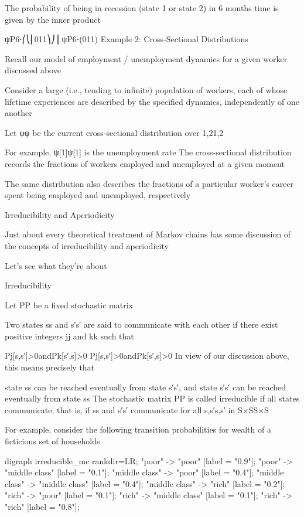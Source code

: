 The probability of being in recession (state 1 or state 2) in 6 months time is given by the inner product

ψP6⋅⎛⎝⎜011⎞⎠⎟
ψP6⋅(011)
Example 2: Cross-Sectional Distributions

Recall our model of employment / unemployment dynamics for a given worker discussed above

Consider a large (i.e., tending to infinite) population of workers, each of whose lifetime experiences are described by the specified dynamics, independently of one another

Let ψψ be the current cross-sectional distribution over {1,2}{1,2}

For example, ψ[1]ψ[1] is the unemployment rate
The cross-sectional distribution records the fractions of workers employed and unemployed at a given moment

The same distribution also describes the fractions of a particular worker’s career spent being employed and unemployed, respectively

Irreducibility and Aperiodicity

Just about every theoretical treatment of Markov chains has some discussion of the concepts of irreducibility and aperiodicity

Let’s see what they’re about

Irreducibility

Let PP be a fixed stochastic matrix

Two states ss and s′s′ are said to communicate with each other if there exist positive integers jj and kk such that

Pj[s,s′]>0andPk[s′,s]>0
Pj[s,s′]>0andPk[s′,s]>0
In view of our discussion above, this means precisely that

state ss can be reached eventually from state s′s′, and
state s′s′ can be reached eventually from state ss
The stochastic matrix PP is called irreducible if all states communicate; that is, if ss and s′s′ communicate for all s,s′s,s′ in S×SS×S

For example, consider the following transition probabilities for wealth of a ficticious set of households

digraph irreducible_mc { rankdir=LR; "poor" -> "poor" [label = "0.9"]; "poor" -> "middle class" [label = "0.1"]; "middle class" -> "poor" [label = "0.4"]; "middle class" -> "middle class" [label = "0.4"]; "middle class" -> "rich" [label = "0.2"]; "rich" -> "poor" [label = "0.1"]; "rich" -> "middle class" [label = "0.1"]; "rich" -> "rich" [label = "0.8"]; }

